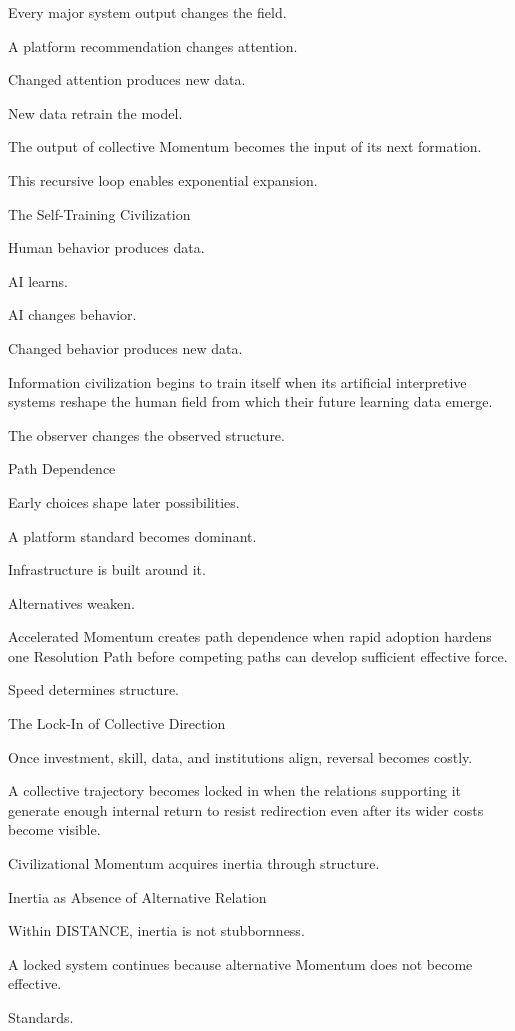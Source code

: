 Every major system output changes the field.

A platform recommendation changes attention.

Changed attention produces new data.

New data retrain the model.

The output of collective Momentum becomes the input of its next formation.

This recursive loop enables exponential expansion.

The Self-Training Civilization

Human behavior produces data.

AI learns.

AI changes behavior.

Changed behavior produces new data.

Information civilization begins to train itself when its artificial interpretive systems reshape the human field from which their future learning data emerge.

The observer changes the observed structure.

Path Dependence

Early choices shape later possibilities.

A platform standard becomes dominant.

Infrastructure is built around it.

Alternatives weaken.

Accelerated Momentum creates path dependence when rapid adoption hardens one Resolution Path before competing paths can develop sufficient effective force.

Speed determines structure.

The Lock-In of Collective Direction

Once investment, skill, data, and institutions align, reversal becomes costly.

A collective trajectory becomes locked in when the relations supporting it generate enough internal return to resist redirection even after its wider costs become visible.

Civilizational Momentum acquires inertia through structure.

Inertia as Absence of Alternative Relation

Within DISTANCE, inertia is not stubbornness.

A locked system continues because alternative Momentum does not become effective.

Standards.

